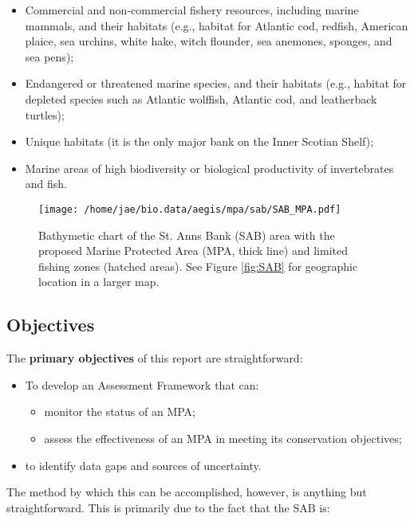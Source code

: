 \documentclass[letterpaper,portrait,11pt]{scrartcl}
\numberwithin{equation}{section}    %
\numberwithin{figure}{section}    %
\numberwithin{table}{section}       %
\begin{document}
\begin{itemize}
	\item Commercial and non-commercial fishery resources, including marine mammals, and their habitats (e.g., habitat for Atlantic cod, redfish, American plaice, sea urchins, white hake, witch flounder, sea anemones, sponges, and sea pens);
  \item Endangered or threatened marine species, and their habitats (e.g., habitat for depleted species such as Atlantic wolffish, Atlantic cod, and leatherback turtles);
  \item Unique habitats (it is the only major bank on the Inner Scotian Shelf);
  \item Marine areas of high biodiversity or biological productivity of invertebrates and fish.
\end{itemize}

\begin{figure}[h]
  \centering
  \texttt{[image: /home/jae/bio.data/aegis/mpa/sab/SAB\_MPA.pdf]}
  \caption{Bathymetic chart of the St. Anns Bank (SAB) area with the proposed Marine Protected Area (MPA, thick line) and limited fishing zones (hatched areas). See Figure \ref{fig:SAB} for geographic location in a larger map.}
  \label{fig:SABCloseup}
\end{figure}

\subsection{Objectives}

The \textbf{primary objectives} of this report are straightforward:

\begin{itemize}
	\item To develop an Assessment Framework that can:
  \begin{itemize}
    \item	monitor the status of an MPA;
  	\item assess the effectiveness of an MPA in meeting its conservation objectives;
  \end{itemize}
  \item to identify data gaps and sources of uncertainty.
\end{itemize}

The method by which this can be accomplished, however, is anything but straightforward. This is primarily due to the fact that the SAB is:
\end{document}

